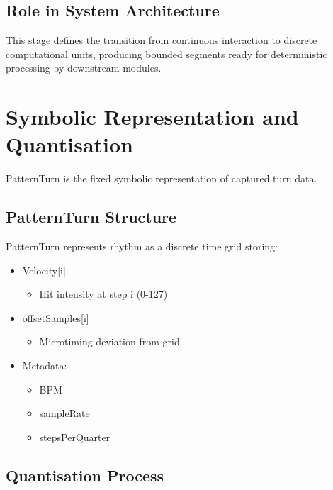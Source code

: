 \subsection{Role in System Architecture}\label{role-in-system-architecture-1}

This stage defines the transition from continuous interaction to
discrete computational units, producing bounded segments ready for
deterministic processing by downstream modules.

\section{Symbolic Representation and Quantisation}\label{symbolic-representation-and-quantisation}

PatternTurn is the fixed symbolic representation of captured turn data.

\subsection{PatternTurn Structure}\label{patternturn-structure}

PatternTurn represents rhythm as a discrete time grid storing:

\begin{itemize}
\item
  Velocity{[}i{]}

  \begin{itemize}
  \item
    Hit intensity at step i (0-127)
  \end{itemize}
\item
  offsetSamples{[}i{]}

  \begin{itemize}
  \item
    Microtiming deviation from grid
  \end{itemize}
\item
  Metadata:

  \begin{itemize}
  \item
    BPM
  \item
    sampleRate
  \item
    stepsPerQuarter
  \end{itemize}
\end{itemize}

\subsection{Quantisation Process}\label{quantisation-process}


